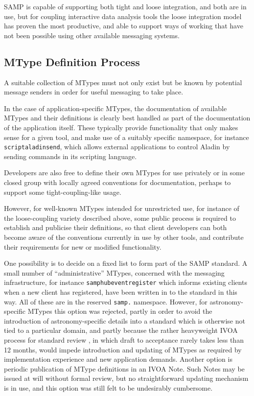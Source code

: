 \documentclass[5p]{elsarticle}
\begin{document}
SAMP is capable of supporting both tight and loose integration,
and both are in use,
but for coupling interactive data analysis tools the loose integration
model has proven the most productive,
and able to support ways of working that have not been possible
using other available messaging systems.

\subsection{MType Definition Process} \label{sec:mtypeProcess}

A suitable collection of MTypes must not only exist but be known by
potential message senders in order for useful messaging to take place.

In the case of application-specific MTypes, the documentation of
available MTypes and their definitions is clearly
best handled as part of the documentation of the application itself.
These typically provide functionality that only makes sense for
a given tool, and make use of a suitably specific namespace,
for instance {\tt script{\kdot}aladin{\kdot}send},
which allows external applications to control Aladin
by sending commands in its scripting language.

Developers are also free to define their own MTypes for use privately
or in some closed group with locally agreed conventions for documentation,
perhaps to support some tight-coupling-like usage.

However, for well-known MTypes intended for unrestricted use,
for instance of the loose-coupling variety described above,
some public process is required to establish
and publicise their definitions, so that client developers can
both become aware of the conventions currently in use by other tools,
and contribute their requirements for new or modified functionality.

One possibility
is to decide on a fixed list to form part of the SAMP standard.
A small number of ``administrative'' MTypes,
concerned with the messaging infrastructure,
for instance {\tt samp{\kdot}hub{\kdot}event{\kdot}register}
which informs existing clients when a new client has registered,
have been written in to the standard in this way.
All of these are in the reserved {\tt samp.} namespace.
However, for astronomy-specific MTypes this option was rejected,
partly in order to avoid the introduction of astronomy-specific details
into a standard which is otherwise not tied to a particular domain,
and partly because the rather heavyweight IVOA process for
standard review \citep{ivoadoc},
in which draft to acceptance rarely takes less than 12 months,
would impede introduction and updating of MTypes as required
by implementation experience and new application demands.
Another option is periodic publication of MType definitions
in an IVOA Note.  Such Notes may be issued at will without formal review,
but no straightforward updating mechanism is in use,
and this option was still felt to be undesirably cumbersome.
\end{document}

